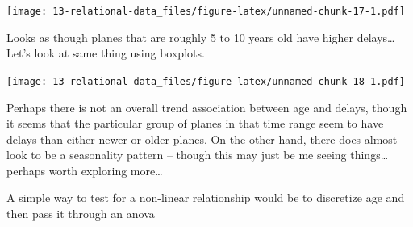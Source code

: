 \documentclass[]{book}
\newenvironment{Shaded}{\begin{snugshade}}{\end{snugshade}}
\newcommand{\DataTypeTok}[1]{\textcolor[rgb]{0.13,0.29,0.53}{#1}}
\newcommand{\DecValTok}[1]{\textcolor[rgb]{0.00,0.00,0.81}{#1}}
\newcommand{\KeywordTok}[1]{\textcolor[rgb]{0.13,0.29,0.53}{\textbf{#1}}}
\newcommand{\NormalTok}[1]{#1}
\newcommand{\OperatorTok}[1]{\textcolor[rgb]{0.81,0.36,0.00}{\textbf{#1}}}
\newcommand{\OtherTok}[1]{\textcolor[rgb]{0.56,0.35,0.01}{#1}}
\newcommand{\StringTok}[1]{\textcolor[rgb]{0.31,0.60,0.02}{#1}}
\theoremstyle{definition}
\theoremstyle{definition}
\theoremstyle{definition}
\theoremstyle{remark}
\begin{document}
\begin{enumerate}
  \texttt{[image: 13-relational-data\_files/figure-latex/unnamed-chunk-17-1.pdf]}

  Looks as though planes that are roughly 5 to 10 years old have higher
  delays\ldots{} Let's look at same thing using boxplots.

\begin{Shaded}
\end{Shaded}

  \texttt{[image: 13-relational-data\_files/figure-latex/unnamed-chunk-18-1.pdf]}

  Perhaps there is not an overall trend association between age and
  delays, though it seems that the particular group of planes in that
  time range seem to have delays than either newer or older planes. On
  the other hand, there does almost look to be a seasonality pattern --
  though this may just be me seeing things\ldots{} perhaps worth
  exploring more\ldots{}

  A simple way to test for a non-linear relationship would be to
  discretize age and then pass it through an anova


\end{enumerate}
\end{document}
